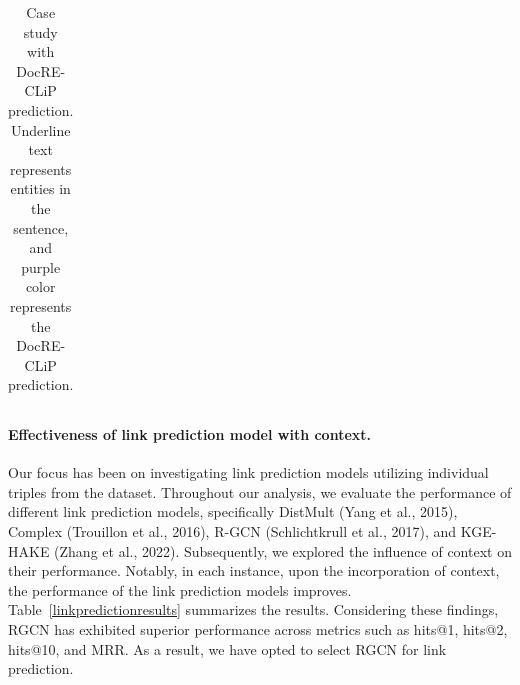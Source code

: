 \documentclass[letterpaper]{article} %
\begin{document}
\begin{table}[ht]
{\begin{tabular}{@{} p{1.2\linewidth}}
\hline
\end{tabular}
}
\caption{Case study with DocRE-CLiP prediction. Underline text represents entities in the sentence, and purple color represents the DocRE-CLiP prediction.}
\label{casestudy}
\end{table}
\paragraph{\textbf{Effectiveness of link prediction model with context.}} Our focus has been on investigating link prediction models utilizing individual triples from the dataset. Throughout our analysis, we evaluate the performance of different link prediction models, specifically DistMult (Yang et al., 2015), Complex (Trouillon et al., 2016), R-GCN (Schlichtkrull et al., 2017), and KGE-HAKE (Zhang et al., 2022). Subsequently, we explored the influence of context on their performance. Notably, in each instance, upon the incorporation of context, the performance of the link prediction models improves.
Table~\ref{linkpredictionresults} summarizes the results. Considering these findings, RGCN has exhibited superior performance across metrics such as hits@1, hits@2, hits@10, and MRR. As a result, we have opted to select RGCN for link prediction.
\end{document}
